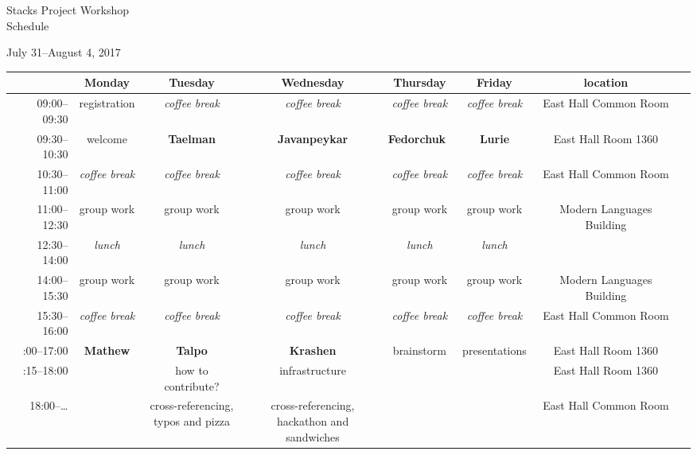 \documentclass[letterpaper,11pt]{article}
\begin{document}

\begin{landscape}

  \newcommand\coffeebreak{\emph{coffee break}}
  \newcommand\groupwork{group work}
  \newcommand\lunch{\emph{lunch}}
  \renewcommand{\arraystretch}{1.35}

\begin{center}
{\Large Stacks Project Workshop \\
Schedule}

{\large July 31--August 4, 2017} \\

\vspace{10pt}


    \begin{tabular}{rccccccc}
      \toprule
                    & Monday              & Tuesday             & Wednesday            & Thursday           & Friday          & location \\
      \midrule
      09:00--09:30  & registration        & \coffeebreak        & \coffeebreak         & \coffeebreak       & \coffeebreak    & East Hall Common Room\\
      09:30--10:30  & welcome             & \textbf{Taelman}    & \textbf{Javanpeykar} & \textbf{Fedorchuk} & \textbf{Lurie}  & East Hall Room 1360 \\
      10:30--11:00  & \coffeebreak        & \coffeebreak        & \coffeebreak         & \coffeebreak       & \coffeebreak    & East Hall Common Room \\
      11:00--12:30  & \groupwork          & \groupwork          & \groupwork           & \groupwork         & \groupwork      & Modern Languages Building \\
      12:30--14:00  & \lunch              & \lunch              & \lunch               & \lunch             & \lunch             \\
      14:00--15:30  & \groupwork          & \groupwork          & \groupwork           & \groupwork         & \groupwork      & Modern Languages Building \\
      15:30--16:00  & \coffeebreak        & \coffeebreak        & \coffeebreak         & \coffeebreak       & \coffeebreak    & East Hall Common Room \\\medskip
      16:00--17:00  & \textbf{Mathew}     & \textbf{Talpo}      & \textbf{Krashen}     & brainstorm         & presentations   & East Hall Room 1360 \\\smallskip
      17:15--18:00  &                     & how to contribute?  & infrastructure & & & East Hall Room 1360 \\
      18:00--\ldots &                     & \parbox{3cm}{\centering cross-referencing, \\ typos and pizza} & \parbox{3cm}{\centering cross-referencing, \\ hackathon and sandwiches} & & & East Hall Common Room \\
      \bottomrule
    \end{tabular}


\end{center}
\end{landscape}
\end{document}
